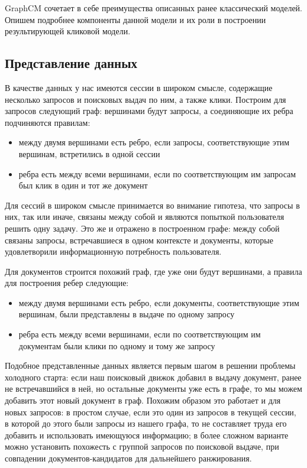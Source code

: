 \documentclass[diploma]{nanolab2015}
\begin{document}
GraphCM \cite{GraphCM} сочетает в себе преимущества описанных ранее классический моделей. Опишем подробнее компоненты данной модели и их роли в построении результирующей кликовой модели.

\subsection{Представление данных}
В качестве данных у нас имеются сессии в широком смысле, содержащие несколько запросов и поисковых выдач по ним, а также клики. Построим для запросов следующий граф: вершинами будут запросы, а соединяющие их ребра подчиняются правилам:
\begin{itemize}
    \item между двумя вершинами есть ребро, если запросы, соответствующие этим вершинам, встретились в одной сессии
    \item ребра есть между всеми вершинами, если по соответствующим им запросам был клик в один и тот же документ
\end{itemize}

Для сессий в широком смысле принимается во внимание гипотеза, что запросы в них, так или иначе, связаны между собой и являются попыткой пользователя решить одну задачу. Это же и отражено в построенном графе: между собой связаны запросы, встречавшиеся в одном контексте и документы, которые удовлетворили информационную потребность пользователя.

Для документов строится похожий граф, где уже они будут вершинами, а правила для построения ребер следующие:
\begin{itemize}
    \item между двумя вершинами есть ребро, если документы, соответствующие этим вершинам, были представлены в выдаче по одному запросу
    \item ребра есть между всеми вершинами, если по соответствующим им документам были клики по одному и тому же запросу
\end{itemize}

Подобное представленные данных является первым шагом в решении проблемы холодного старта: если наш поисковый движок добавил в выдачу документ, ранее не встречавшийся в ней, но остальные документы уже есть в графе, то мы можем добавить этот новый документ в граф. Похожим образом это работает и для новых запросов: в простом случае, если это один из запросов в текущей сессии, в которой до этого были запросы из нашего графа, то не составляет труда его добавить и использовать имеющуюся информацию; в более сложном варианте можно установить похожесть с группой запросов по поисковой выдаче, при совпадении документов-кандидатов для дальнейшего ранжирования.
\end{document}
